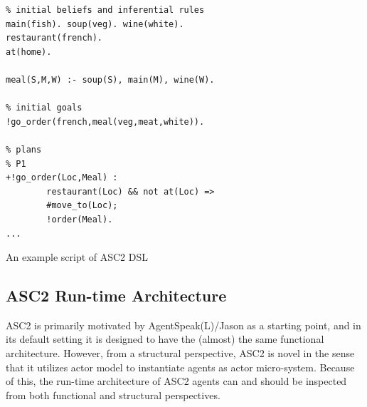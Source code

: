 \begin{listing}[!h]
\begin{verbatim}
% initial beliefs and inferential rules
main(fish). soup(veg). wine(white).
restaurant(french).
at(home).

meal(S,M,W) :- soup(S), main(M), wine(W).

% initial goals
!go_order(french,meal(veg,meat,white)).

% plans
% P1
+!go_order(Loc,Meal) :
        restaurant(Loc) && not at(Loc) =>
        #move_to(Loc);
        !order(Meal).
...
\end{verbatim}
\caption{An example script of ASC2 DSL}
\label{lst:domestic_robot}
\end{listing}









\subsection{ASC2 Run-time Architecture}
\label{section_arch}
ASC2 is primarily motivated by AgentSpeak(L)/Jason as a starting point, and in its default setting it is designed to have the (almost) the same functional architecture. However, from a structural perspective, ASC2 is novel in the sense that it utilizes actor model to instantiate agents as actor micro-system. Because of this, the run-time architecture of ASC2 agents can and should be inspected from both functional and structural perspectives. 

